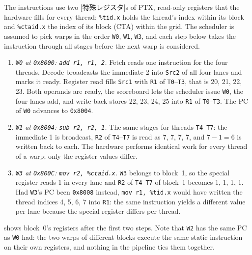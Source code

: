\documentclass[../main.tex]{subfiles}
\begin{document}
The instructions use two [特殊レジスタ]s of PTX,
read-only registers that the hardware fills for every thread:
\texttt{\%tid.x} holds the thread's index within its block and
\texttt{\%ctaid.x} the index of its block (CTA) within the
grid.  The scheduler is assumed to pick warps in the order
\texttt{W0}, \texttt{W1}, \texttt{W3}, and each step below takes the
instruction through all stages before the next warp is considered.
\begin{enumerate}
  \item \emph{\texttt{W0} at \texttt{0x8000}: \texttt{add r1, r1, 2}.}
    Fetch reads one instruction for the four threads.  Decode broadcasts
    the immediate 2 into \texttt{Src2} of all four lanes and marks it
    ready.  Register read fills \texttt{Src1} with \texttt{R1} of
    \texttt{T0}--\texttt{T3}, that is 20, 21, 22, 23.  Both operands
    are ready, the scoreboard lets the scheduler issue \texttt{W0}, the
    four lanes add, and write-back stores 22, 23, 24, 25 into
    \texttt{R1} of \texttt{T0}--\texttt{T3}.  The PC of \texttt{W0}
    advances to \texttt{0x8004}.
  \item \emph{\texttt{W1} at \texttt{0x8004}: \texttt{sub r2, r2, 1}.}
    The same stages for threads \texttt{T4}--\texttt{T7}: the immediate
    1 is broadcast, \texttt{R2} of \texttt{T4}--\texttt{T7} is read as
    7, 7, 7, 7, and $7 - 1 = 6$ is written back to each.  The hardware
    performs identical work for every thread of a warp; only the
    register values differ.
  \item \emph{\texttt{W3} at \texttt{0x800C}: \texttt{mov r2, \%ctaid.x}.}
    \texttt{W3} belongs to block~1, so the special register reads 1 in
    every lane and \texttt{R2} of \texttt{T4}--\texttt{T7} of block~1
    becomes 1, 1, 1, 1.  Had \texttt{W3}'s PC been \texttt{0x8008}
    instead, \texttt{mov r1, \%tid.x} would have written the thread
    indices 4, 5, 6, 7 into \texttt{R1}: the same instruction yields a
    different value per lane because the special register differs per
    thread.
\end{enumerate}
 shows block~0's registers after the
first two steps.  Note that \texttt{W2} has the same PC as \texttt{W0}
had: the two warps of different blocks execute the same static
instruction on their own registers, and nothing in the pipeline ties
them together.
\end{document}
